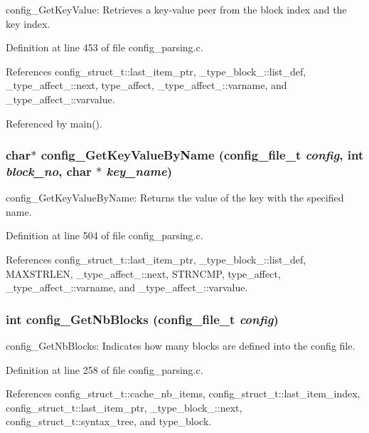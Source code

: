 config\_\-Get\-Key\-Value: Retrieves a key-value peer from the block index and the key index. 

Definition at line 453 of file config\_\-parsing.c.

References config\_\-struct\_\-t::last\_\-item\_\-ptr, \_\-type\_\-block\_\-::list\_\-def, \_\-type\_\-affect\_\-::next, type\_\-affect, \_\-type\_\-affect\_\-::varname, and \_\-type\_\-affect\_\-::varvalue.

Referenced by main().
\subsubsection{\setlength{\rightskip}{0pt plus 5cm}char$\ast$ config\_\-Get\-Key\-Value\-By\-Name (config\_\-file\_\-t {\em config}, int {\em block\_\-no}, char $\ast$ {\em key\_\-name})}\label{config__parsing_8c_a16}


config\_\-Get\-Key\-Value\-By\-Name: Returns the value of the key with the specified name. 

Definition at line 504 of file config\_\-parsing.c.

References config\_\-struct\_\-t::last\_\-item\_\-ptr, \_\-type\_\-block\_\-::list\_\-def, MAXSTRLEN, \_\-type\_\-affect\_\-::next, STRNCMP, type\_\-affect, \_\-type\_\-affect\_\-::varname, and \_\-type\_\-affect\_\-::varvalue.
\subsubsection{\setlength{\rightskip}{0pt plus 5cm}int config\_\-Get\-Nb\-Blocks (config\_\-file\_\-t {\em config})}\label{config__parsing_8c_a10}


config\_\-Get\-Nb\-Blocks: Indicates how many blocks are defined into the config file. 

Definition at line 258 of file config\_\-parsing.c.

References config\_\-struct\_\-t::cache\_\-nb\_\-items, config\_\-struct\_\-t::last\_\-item\_\-index, config\_\-struct\_\-t::last\_\-item\_\-ptr, \_\-type\_\-block\_\-::next, config\_\-struct\_\-t::syntax\_\-tree, and type\_\-block.

